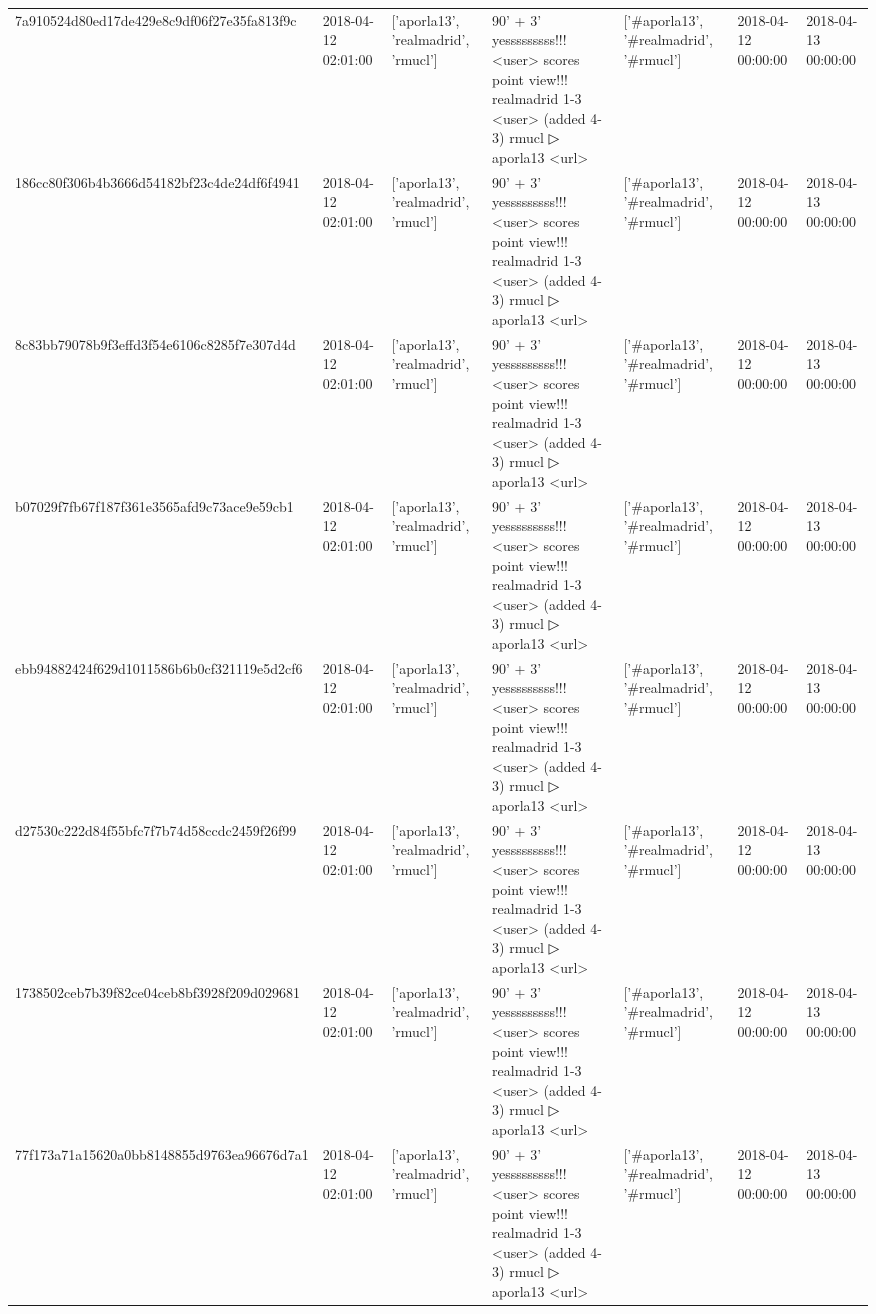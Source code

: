 \begin{tabular}{lllllll}
7a910524d80ed17de429e8c9df06f27e35fa813f9c & 2018-04-12 02:01:00 & ['aporla13', 'realmadrid', 'rmucl'] & 90' + 3' yesssssssss!!! <user> scores point view!!! realmadrid 1-3 <user> (added 4-3) rmucl ▷ aporla13 <url> & ['#aporla13', '#realmadrid', '#rmucl'] & 2018-04-12 00:00:00 & 2018-04-13 00:00:00 \\
186cc80f306b4b3666d54182bf23c4de24df6f4941 & 2018-04-12 02:01:00 & ['aporla13', 'realmadrid', 'rmucl'] & 90' + 3' yesssssssss!!! <user> scores point view!!! realmadrid 1-3 <user> (added 4-3) rmucl ▷ aporla13 <url> & ['#aporla13', '#realmadrid', '#rmucl'] & 2018-04-12 00:00:00 & 2018-04-13 00:00:00 \\
8c83bb79078b9f3effd3f54e6106c8285f7e307d4d & 2018-04-12 02:01:00 & ['aporla13', 'realmadrid', 'rmucl'] & 90' + 3' yesssssssss!!! <user> scores point view!!! realmadrid 1-3 <user> (added 4-3) rmucl ▷ aporla13 <url> & ['#aporla13', '#realmadrid', '#rmucl'] & 2018-04-12 00:00:00 & 2018-04-13 00:00:00 \\
b07029f7fb67f187f361e3565afd9c73ace9e59cb1 & 2018-04-12 02:01:00 & ['aporla13', 'realmadrid', 'rmucl'] & 90' + 3' yesssssssss!!! <user> scores point view!!! realmadrid 1-3 <user> (added 4-3) rmucl ▷ aporla13 <url> & ['#aporla13', '#realmadrid', '#rmucl'] & 2018-04-12 00:00:00 & 2018-04-13 00:00:00 \\
ebb94882424f629d1011586b6b0cf321119e5d2cf6 & 2018-04-12 02:01:00 & ['aporla13', 'realmadrid', 'rmucl'] & 90' + 3' yesssssssss!!! <user> scores point view!!! realmadrid 1-3 <user> (added 4-3) rmucl ▷ aporla13 <url> & ['#aporla13', '#realmadrid', '#rmucl'] & 2018-04-12 00:00:00 & 2018-04-13 00:00:00 \\
d27530c222d84f55bfc7f7b74d58ccdc2459f26f99 & 2018-04-12 02:01:00 & ['aporla13', 'realmadrid', 'rmucl'] & 90' + 3' yesssssssss!!! <user> scores point view!!! realmadrid 1-3 <user> (added 4-3) rmucl ▷ aporla13 <url> & ['#aporla13', '#realmadrid', '#rmucl'] & 2018-04-12 00:00:00 & 2018-04-13 00:00:00 \\
1738502ceb7b39f82ce04ceb8bf3928f209d029681 & 2018-04-12 02:01:00 & ['aporla13', 'realmadrid', 'rmucl'] & 90' + 3' yesssssssss!!! <user> scores point view!!! realmadrid 1-3 <user> (added 4-3) rmucl ▷ aporla13 <url> & ['#aporla13', '#realmadrid', '#rmucl'] & 2018-04-12 00:00:00 & 2018-04-13 00:00:00 \\
77f173a71a15620a0bb8148855d9763ea96676d7a1 & 2018-04-12 02:01:00 & ['aporla13', 'realmadrid', 'rmucl'] & 90' + 3' yesssssssss!!! <user> scores point view!!! realmadrid 1-3 <user> (added 4-3) rmucl ▷ aporla13 <url> & ['#aporla13', '#realmadrid', '#rmucl'] & 2018-04-12 00:00:00 & 2018-04-13 00:00:00 \\

\end{tabular}
